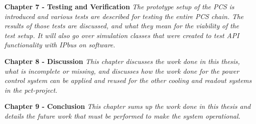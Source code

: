 \documentclass[main.tex]{subfiles}
\begin{document}
\textbf{Chapter 7 - Testing and Verification} \textit{The prototype setup of the PCS is introduced and various tests are described for testing the entire PCS chain. The results of those tests are discussed, and what they mean for the viability of the test setup. It will also go over simulation classes that were created to test API functionality with IPbus on software.}

\textbf{Chapter 8 - Discussion} \textit{This chapter discusses the work done in this thesis, what is incomplete or missing, and discusses how the work done for the power control system can be applied and reused for the other cooling and readout systems in the \gls{pct}-project.}

\textbf{Chapter 9 - Conclusion} \textit{This chapter sums up the work done in this thesis and details the future work that must be performed to make the system operational.}
\end{document}
